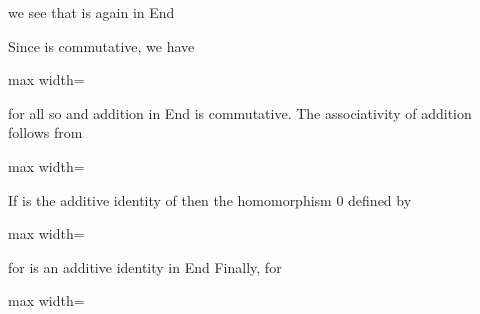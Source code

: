 \documentclass[11pt,oneside]{article}
\begin{document}
\begin{BookBody}
\noindent we see that \BookInline{\phi + \psi } is again in End

Since  is commutative, we have

\begin{center}\begin{adjustbox}{max width=\linewidth}\end{adjustbox}\end{center}

\end{BookBody}

\BookNarrativetrue

\begin{BookBody}

\noindent for all  so \BookInline{\phi + \psi = \psi + \phi } and addition in End is commutative. The associativity of addition follows from

\begin{center}\begin{adjustbox}{max width=\linewidth}\end{adjustbox}\end{center}

\noindent If  is the additive identity of  then the homomorphism 0 defined by

\begin{center}\begin{adjustbox}{max width=\linewidth}\end{adjustbox}\end{center}

\noindent for  is an additive identity in End Finally, for

\begin{center}\begin{adjustbox}{max width=\linewidth}\end{adjustbox}\end{center}


\end{BookBody}
\end{document}
